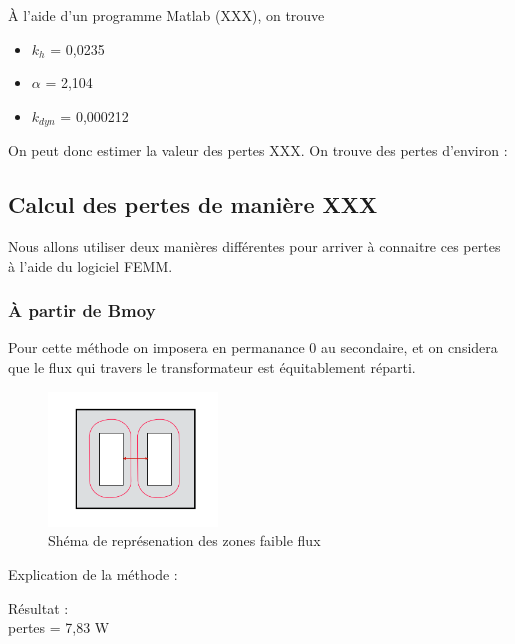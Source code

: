 À l'aide d'un programme Matlab (XXX), on trouve 
\begin{itemize}
\item  $k_h$   = 0,0235
\item $\alpha$ = 2,104
\item $k_{dyn}$ = 0,000212
\end{itemize}

On peut donc estimer la valeur des pertes XXX. On trouve des pertes d'environ : 



\subsection{Calcul des pertes de manière XXX}

Nous allons utiliser deux manières différentes pour arriver à connaitre ces pertes à l'aide du logiciel FEMM.

\subsubsection{À partir de Bmoy}

	Pour cette méthode on imposera en permanance 0 au secondaire, et on cnsidera que le flux qui travers le transformateur est équitablement réparti. \\

\begin{figure}[ht]
	\begin{center}
	\includegraphics[width=0.4\textwidth]{images/TP3_repartission_Bmoy}
	\caption{Shéma de représenation des zones faible flux}\label{img:RepChampsBmoy}
	\end{center}
\end{figure}
\FloatBarrier

Explication de la méthode : 


Résultat : \\
pertes = 7,83 W\\

